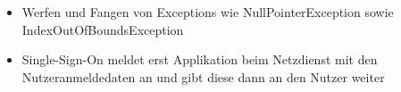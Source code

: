 \documentclass[12pt,DIV14,BCOR10mm,a4paper,parskip=half-,headsepline,headinclude,english,ngerman,bibliography=totocnumbered]{scrreprt}
\begin{document}
\begin{itemize}
  \item Werfen und Fangen von Exceptions wie NullPointerException sowie IndexOutOfBoundsException
  \item Single-Sign-On meldet erst Applikation beim Netzdienst mit den Nutzeranmeldedaten an und gibt diese dann an den Nutzer weiter
\end{itemize}

\printbibliography

\printacronyms[title=Abkürzungsverzeichnis,toctitle=Abkürzungsverzeichnis]
\printglossary[title=Glossar,toctitle=Glossar,type=main]

\iftotalfigures
  \listoffigures
\fi


\begin{appendices}

\end{appendices}
\end{document}
